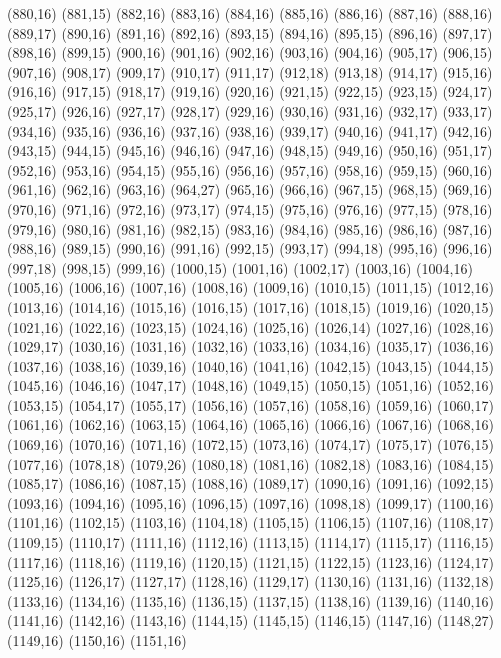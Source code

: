 (880,16)
(881,15)
(882,16)
(883,16)
(884,16)
(885,16)
(886,16)
(887,16)
(888,16)
(889,17)
(890,16)
(891,16)
(892,16)
(893,15)
(894,16)
(895,15)
(896,16)
(897,17)
(898,16)
(899,15)
(900,16)
(901,16)
(902,16)
(903,16)
(904,16)
(905,17)
(906,15)
(907,16)
(908,17)
(909,17)
(910,17)
(911,17)
(912,18)
(913,18)
(914,17)
(915,16)
(916,16)
(917,15)
(918,17)
(919,16)
(920,16)
(921,15)
(922,15)
(923,15)
(924,17)
(925,17)
(926,16)
(927,17)
(928,17)
(929,16)
(930,16)
(931,16)
(932,17)
(933,17)
(934,16)
(935,16)
(936,16)
(937,16)
(938,16)
(939,17)
(940,16)
(941,17)
(942,16)
(943,15)
(944,15)
(945,16)
(946,16)
(947,16)
(948,15)
(949,16)
(950,16)
(951,17)
(952,16)
(953,16)
(954,15)
(955,16)
(956,16)
(957,16)
(958,16)
(959,15)
(960,16)
(961,16)
(962,16)
(963,16)
(964,27)
(965,16)
(966,16)
(967,15)
(968,15)
(969,16)
(970,16)
(971,16)
(972,16)
(973,17)
(974,15)
(975,16)
(976,16)
(977,15)
(978,16)
(979,16)
(980,16)
(981,16)
(982,15)
(983,16)
(984,16)
(985,16)
(986,16)
(987,16)
(988,16)
(989,15)
(990,16)
(991,16)
(992,15)
(993,17)
(994,18)
(995,16)
(996,16)
(997,18)
(998,15)
(999,16)
(1000,15)
(1001,16)
(1002,17)
(1003,16)
(1004,16)
(1005,16)
(1006,16)
(1007,16)
(1008,16)
(1009,16)
(1010,15)
(1011,15)
(1012,16)
(1013,16)
(1014,16)
(1015,16)
(1016,15)
(1017,16)
(1018,15)
(1019,16)
(1020,15)
(1021,16)
(1022,16)
(1023,15)
(1024,16)
(1025,16)
(1026,14)
(1027,16)
(1028,16)
(1029,17)
(1030,16)
(1031,16)
(1032,16)
(1033,16)
(1034,16)
(1035,17)
(1036,16)
(1037,16)
(1038,16)
(1039,16)
(1040,16)
(1041,16)
(1042,15)
(1043,15)
(1044,15)
(1045,16)
(1046,16)
(1047,17)
(1048,16)
(1049,15)
(1050,15)
(1051,16)
(1052,16)
(1053,15)
(1054,17)
(1055,17)
(1056,16)
(1057,16)
(1058,16)
(1059,16)
(1060,17)
(1061,16)
(1062,16)
(1063,15)
(1064,16)
(1065,16)
(1066,16)
(1067,16)
(1068,16)
(1069,16)
(1070,16)
(1071,16)
(1072,15)
(1073,16)
(1074,17)
(1075,17)
(1076,15)
(1077,16)
(1078,18)
(1079,26)
(1080,18)
(1081,16)
(1082,18)
(1083,16)
(1084,15)
(1085,17)
(1086,16)
(1087,15)
(1088,16)
(1089,17)
(1090,16)
(1091,16)
(1092,15)
(1093,16)
(1094,16)
(1095,16)
(1096,15)
(1097,16)
(1098,18)
(1099,17)
(1100,16)
(1101,16)
(1102,15)
(1103,16)
(1104,18)
(1105,15)
(1106,15)
(1107,16)
(1108,17)
(1109,15)
(1110,17)
(1111,16)
(1112,16)
(1113,15)
(1114,17)
(1115,17)
(1116,15)
(1117,16)
(1118,16)
(1119,16)
(1120,15)
(1121,15)
(1122,15)
(1123,16)
(1124,17)
(1125,16)
(1126,17)
(1127,17)
(1128,16)
(1129,17)
(1130,16)
(1131,16)
(1132,18)
(1133,16)
(1134,16)
(1135,16)
(1136,15)
(1137,15)
(1138,16)
(1139,16)
(1140,16)
(1141,16)
(1142,16)
(1143,16)
(1144,15)
(1145,15)
(1146,15)
(1147,16)
(1148,27)
(1149,16)
(1150,16)
(1151,16)
